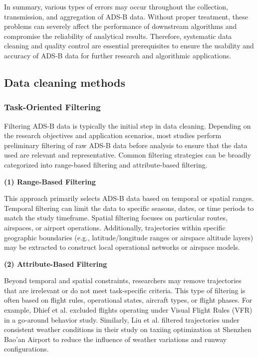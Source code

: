 In summary, various types of errors may occur throughout the collection, transmission, and aggregation of ADS-B data. Without proper treatment, these problems can severely affect the performance of downstream algorithms and compromise the reliability of analytical results. Therefore, systematic data cleaning and quality control are essential prerequisites to ensure the usability and accuracy of ADS-B data for further research and algorithmic applications.

\subsection {Data cleaning methods}
\subsubsection{Task-Oriented Filtering}
Filtering ADS-B data is typically the initial step in data cleaning. Depending on the research objectives and application scenarios, most studies perform preliminary filtering of raw ADS-B data before analysis to ensure that the data used are relevant and representative. Common filtering strategies can be broadly categorized into range-based filtering and attribute-based filtering.

\textbf{(1) Range-Based Filtering}

This approach primarily selects ADS-B data based on temporal or spatial ranges. Temporal filtering can limit the data to specific seasons, dates, or time periods to match the study timeframe. Spatial filtering focuses on particular routes, airspaces, or airport operations. Additionally, trajectories within specific geographic boundaries (e.g., latitude/longitude ranges or airspace altitude layers) may be extracted to construct local operational networks or airspace models.

\textbf{(2) Attribute-Based Filtering}

Beyond temporal and spatial constraints, researchers may remove trajectories that are irrelevant or do not meet task-specific criteria. This type of filtering is often based on flight rules, operational states, aircraft types, or flight phases. For example, Dhief et al. \cite{dhief2021tree} excluded flights operating under Visual Flight Rules (VFR) in a go-around behavior study. Similarly, Liu et al. \cite{LIU2024104652id} filtered trajectories under consistent weather conditions in their study on taxiing optimization at Shenzhen Bao’an Airport to reduce the influence of weather variations and runway configurations.

